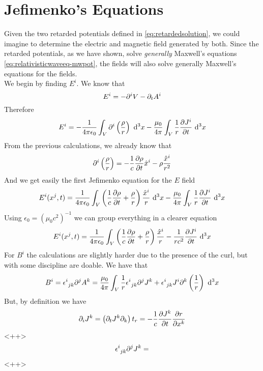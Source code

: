 \documentclass[../electromagnetism.tex]{subfiles}
\begin{document}
\section{Jefimenko's Equations}
Given the two retarded potentials defined in \eqref{eq:retardedsolution}, we could imagine to determine the electric and magnetic field generated by both. Since the retarded potentials, as we have shown, solve \textit{generally} Maxwell's equations \eqref{eq:relativisticwaveeq-mwpot}, the fields will also solve generally Maxwell's equations for the fields.\\
We begin by finding $E^i$. We know that
\begin{equation*}
	E^i=-\partial^iV-\partial_tA^i
\end{equation*}
Therefore
\begin{equation}
	E^i=-\frac{1}{4\pi\epsilon_0}\int_{V}^{}\partial^i\left( \frac{\rho}{r} \right)\ \mathrm{d}^{3}{x}-\frac{\mu_0}{4\pi}\int_{V}^{}\frac{1}{r}\pdv{J^i}{t}\ \mathrm{d}^{3}{x}
	\label{eq:Efieldimenko}
\end{equation}
From the previous calculations, we already know that
\begin{equation*}
	\partial^i\left( \frac{\rho}{r} \right)=-\frac{1}{c}\pdv{\rho}{t}\hat{x}^i-\rho\frac{\hat{x}^i}{r^2}
\end{equation*}
And we get easily the first Jefimenko equation for the $E$ field
\begin{equation*}
	E^i(x^j,t)=\frac{1}{4\pi\epsilon_0}\int_{V}^{}\left( \frac{1}{c}\pdv{\rho}{t}+\frac{\rho}{r} \right)\frac{\hat{x}^i}{r}\ \mathrm{d}^{3}{x}-\frac{\mu_0}{4\pi}\int_{V}^{}\frac{1}{r}\pdv{J^i}{t}\ \mathrm{d}^{3}{x}
\end{equation*}
Using $\epsilon_0=(\mu_0c^2)^{-1}$ we can group everything in a clearer equation
\begin{equation}
	E^i(x^j,t)=\frac{1}{4\pi\epsilon_0}\int_{V}^{}\left( \frac{1}{c}\pdv{\rho}{t}+\frac{\rho}{r} \right)\frac{\hat{x}^i}{r}-\frac{1}{rc^2}\pdv{J^i}{t}\ \mathrm{d}^{3}{x}
	\label{eq:Efimenko}
\end{equation}
For $B^i$ the calculations are slightly harder due to the presence of the curl, but with some discipline are doable. We have that
\begin{equation*}
	B^i=\epsilon^{i}_{\ jk}\partial^jA^k=\frac{\mu_0}{4\pi}\int_{V}^{}\frac{1}{r}\epsilon^{i}_{\ jk}\partial^jJ^k+\epsilon^{i}_{\ jk}J^i\partial^k\left( \frac{1}{r} \right)\ \mathrm{d}^{3}{x}
\end{equation*}
But, by definition we have
\begin{equation*}
	\partial_iJ^k=\left( \partial_tJ^k\partial_k \right)t_r=-\frac{1}{c}\pdv{J^k}{t}\pdv{r}{x^k}
\end{equation*}
<++>
\begin{equation*}
	\epsilon^{i}_{\ jk}\partial^jJ^k=
\end{equation*}<++>
\end{document}
